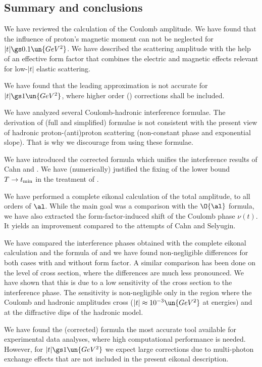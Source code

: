 


\subsection[int sum]{Summary and conclusions}

We have reviewed the calculation of the Coulomb amplitude. We have found that the influence of proton's magnetic moment can not be neglected for $|t| \gs 0.1\un{GeV^2}$. We have described the scattering amplitude with the help of an effective form factor that combines the electric and magnetic effects relevant for low-$|t|$ elastic scattering.

We have found that the leading  approximation is not accurate for $|t| \gs 1\un{GeV^2}$, where higher order () corrections shall be included.

We have analyzed several Coulomb-hadronic interference formulae. The derivation of (full and simplified) \WaY{} formulae is not consistent with the present view of hadronic proton-(anti)proton scattering (non-constant phase and exponential slope). That is why we discourage from using these formulae.

We have introduced the corrected \KaL{} formula which unifies the interference results of Cahn and \KaL. We have (numerically) justified the fixing of the lower bound $T\to t_{\rm min}$ in the treatment of \KaL{}.

We have performed a complete eikonal calculation of the total amplitude, to all orders of $\al$. While the main goal was a comparison with the $\O{\al}$ \KaL{} formula, we have also extracted the form-factor-induced shift of the Coulomb phase $\nu(t)$. It yields an improvement compared to the attempts of Cahn and Selyugin.

We have compared the interference phases obtained with the complete eikonal calculation and the formula of \KaL{} and we have found non-negligible differences for both cases with and without form factor. A similar comparison has been done on the level of cross section, where the differences are much less pronounced. We have shown that this is due to a low sensitivity of the cross section to the interference phase. The sensitivity is non-negligible only in the region where the Coulomb and hadronic amplitudes cross ($|t|\approx 10^{-3}\un{GeV^2}$ at  energies) and at the diffractive dips of the hadronic model.

We have found the (corrected) \KaL{} formula the most accurate tool available for experimental data analyses, where high computational performance is needed. However, for $|t| \gs 1\un{GeV^2}$ we expect large corrections due to multi-photon exchange effects that are not included in the present eikonal description.

